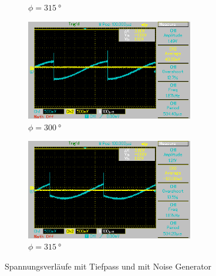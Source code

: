\begin{figure}
\begin{subfigure}{0.5\textwidth}
    \caption{$\phi = \qty[]{315}{\degree}$}%
    \end{subfigure}%
    \hfill
    \begin{subfigure}{0.5\textwidth}%
    \centering%
    \includegraphics[width = 7.3cm]{./Oszilloskop Bilder/png/5.3/nt9.png}%
    \caption{$\phi = \qty[]{300}{\degree}$}%
    \end{subfigure}%
    \hfill
    \begin{subfigure}{0.5\textwidth}%
    \centering%
    \includegraphics[width = 7.3cm]{./Oszilloskop Bilder/png/5.3/nt10.png}%
    \caption{$\phi = \qty[]{315}{\degree}$}%
    \end{subfigure}%
    \caption{Spannungsverläufe mit Tiefpass und mit Noise Generator}%
\end{figure}%
